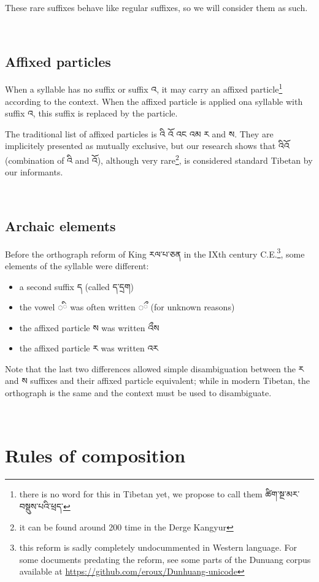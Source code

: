 \documentclass[%
a4paper,%
pagesize,%
12pt,%
parskip=off,%
bibliography=totoc,%
numbers=noenddot,%
DIV=12,%
twoside=semi,%
headings=normal%
]{scrartcl}
\begin{document}
These rare suffixes behave like regular suffixes, so we will consider them as such.

­\subsection{Affixed particles}

When a syllable has no suffix or suffix འ, it may carry an affixed particle\footnote{there is no word for this in Tibetan yet, we propose to call them ཚིག་སྔ་མར་བསྡུས་པའི་ཕྲད་} according to the context. When the affixed particle is applied ona syllable with suffix འ, this suffix is replaced by the particle.

The traditional list of affixed particles is འི འོ འང འམ ར and ས. They are implicitely presented as mutually exclusive, but our research shows that འིའོ (combination of འི and འོ), although very rare\footnote{it can be found around 200 time in the Derge Kangyur}, is considered standard Tibetan by our informants.

­\subsection{Archaic elements}

Before the orthograph reform of King རལ་པ་ཅན in the \textsc{IX}th century \textsc{C.E.}\footnote{this reform is sadly completely undocummented in Western language. For some documents predating the reform, see some parts of the Dunuang corpus available at \url{https://github.com/eroux/Dunhuang-unicode}}, some elements of the syllable were different:

\begin{itemize}
\item a second suffix ད (called ད་དྲག)
\item the vowel {\tibetanfont ◌}ི was often written {\tibetanfont ◌}ྀ (for unknown reasons)
\item the affixed particle ས was written འྀས
\item the affixed particle ར was written འར
\end{itemize}

Note that the last two differences allowed simple disambiguation between the ར and ས suffixes and their affixed particle equivalent; while in modern Tibetan, the orthograph is the same and the context must be used to disambiguate.

­\section{Rules of composition}
\end{document}
